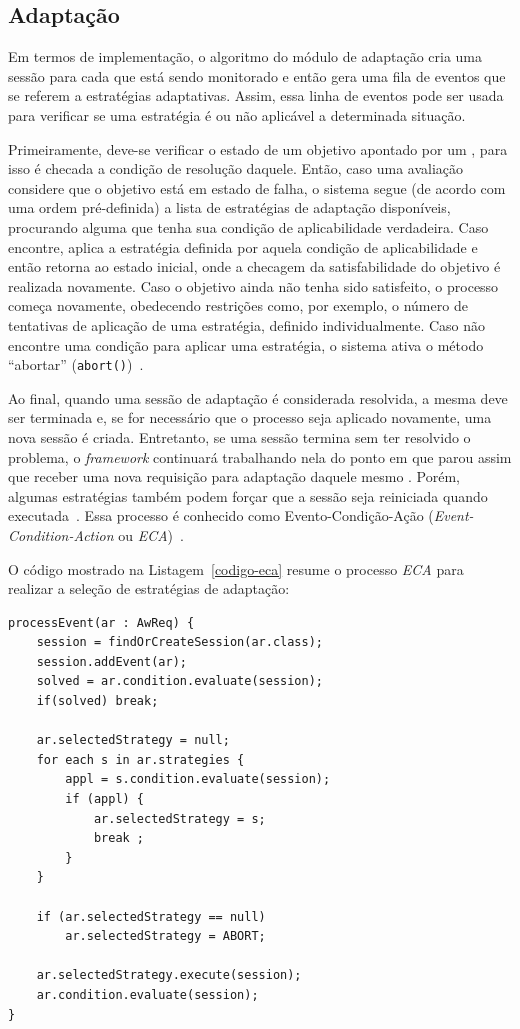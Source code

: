 \subsection{Adaptação}
\label{sec-referencial-zanshin-adaptacao}
Em termos de implementação, o algoritmo do módulo de adaptação cria uma sessão para cada \awreq que está sendo monitorado e então gera uma fila de eventos que se referem a estratégias adaptativas. Assim, essa linha de eventos pode ser usada para verificar se uma estratégia é ou não aplicável a determinada situação. 

Primeiramente, deve-se verificar o estado de um objetivo apontado por um \awreq, para isso é checada a condição de resolução daquele. Então, caso uma avaliação considere que o objetivo está em estado de falha, o sistema segue (de acordo com uma ordem pré-definida) a lista de estratégias de adaptação disponíveis, procurando alguma que tenha sua condição de aplicabilidade verdadeira. Caso encontre, aplica a estratégia definida por aquela condição de aplicabilidade e então retorna ao estado inicial, onde a checagem da satisfabilidade do objetivo é realizada novamente. Caso o objetivo ainda não tenha sido satisfeito, o processo começa novamente, obedecendo restrições como, por exemplo, o número de tentativas de aplicação de uma estratégia, definido individualmente. Caso não encontre uma condição para aplicar uma estratégia, o sistema ativa o método ``abortar'' (\texttt{abort()})~\cite{souza2013requirements}. 

Ao final, quando uma sessão de adaptação é considerada resolvida, a mesma deve ser terminada e, se for necessário que o processo seja aplicado novamente, uma nova sessão é criada. Entretanto, se uma sessão termina sem ter resolvido o problema, o \textit{framework} continuará trabalhando nela do ponto em que parou assim que receber uma nova requisição para adaptação daquele mesmo \awreq. Porém, algumas estratégias também podem forçar que a sessão seja reiniciada quando executada~\cite{souza2013requirements}. Essa processo é conhecido como Evento-Condição-Ação (\textit{Event-Condition-Action} ou \textit{ECA})~\cite{morin2009models}.

O código mostrado na Listagem~\ref{codigo-eca} resume o processo \textit{ECA} para realizar a seleção de estratégias de adaptação:

\begin{lstlisting}[caption={Código do processo ECA},label={codigo-eca}]
processEvent(ar : AwReq) {
	session = findOrCreateSession(ar.class);
	session.addEvent(ar);
	solved = ar.condition.evaluate(session);
	if(solved) break;

	ar.selectedStrategy = null;
	for each s in ar.strategies {
		appl = s.condition.evaluate(session);
		if (appl) {
			ar.selectedStrategy = s;
			break ;
		}
	}

	if (ar.selectedStrategy == null)
		ar.selectedStrategy = ABORT;

	ar.selectedStrategy.execute(session);
	ar.condition.evaluate(session);
}
\end{lstlisting}

